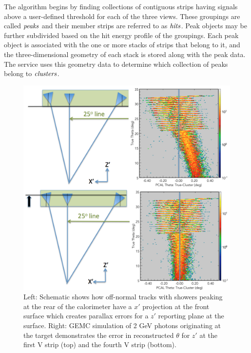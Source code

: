The algorithm begins by finding collections of contiguous strips having signals above a user-defined threshold for each of the three views. These groupings are called $\it{peaks}$ and their member strips are referred to as $\it{hits}$.  Peak objects may be further subdivided based on the hit energy profile of the groupings.  Each peak object is associated with the one or more stacks of strips that belong to it, and the three-dimensional geometry of each stack is stored along with the peak data.  The service uses this geometry data to determine which collection of peaks belong to $\it{clusters}$. 

\begin{figure}[hbt]
\centering
\includegraphics[width=0.95\columnwidth,keepaspectratio]{img/S6_1.png}
\caption{Left: Schematic shows how off-normal tracks with showers peaking at the rear of the calorimeter have a $x'$ projection at the front surface which creates parallax errors for a $z'$ reporting plane at the surface.  Right: GEMC simulation of 2 GeV photons originating at the target demonstrates the error in reconstructed $\theta$ for $z'$ at the first V strip (top) and the fourth V strip (bottom).}
\label{fig:S6_1}
\end{figure}

